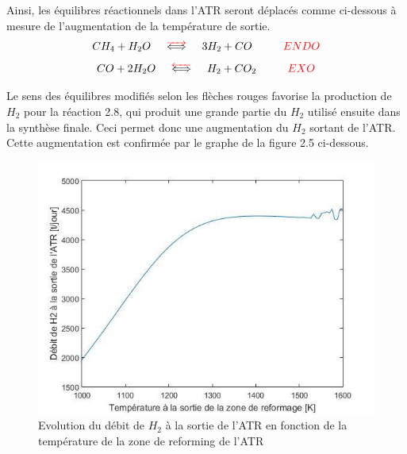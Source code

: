 \documentclass[12pt]{report}
\begin{document}
Ainsi, les équilibres réactionnels dans l'ATR seront déplacés comme ci-dessous à mesure de l'augmentation de la température de sortie.\\

 \begin{equation}
 CH_4 + H_2O \hspace{0.5cm}\textcolor{red}{\overrightarrow{\textcolor{black}{\Longleftrightarrow}}} \hspace{0.5cm} 3H_2 + CO \hspace{1cm}\textcolor{red}{ENDO}
 \end{equation}
 \begin{equation}
 CO + 2H_2O \hspace{0.5cm}\textcolor{red}{\overleftarrow{\textcolor{black}{\Longleftrightarrow}}} \hspace{0.5cm} H_2 + CO_2 \hspace{1cm}\textcolor{red}{EXO}
 \end{equation}

Le sens des équilibres modifiés selon les flèches rouges favorise la production de $H_2$ pour la réaction 2.8, qui produit une grande partie du $H_2$ utilisé ensuite dans la synthèse finale. Ceci permet donc une augmentation du $H_2$ sortant de l'ATR.\\
Cette augmentation est confirmée par le graphe de la figure 2.5 ci-dessous.\\


\begin{figure}[H]
\begin{center}
\includegraphics[scale=0.6]{debit_H2_ATR_Temperature}
\caption{Evolution du débit de $H_2$ à la sortie de l'ATR en fonction de la température de la zone de reforming de l'ATR}
\end{center}
\end{figure}
\end{document}
